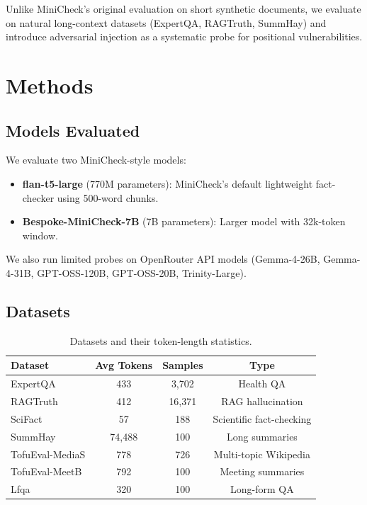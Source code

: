 \documentclass{article}
\begin{document}
Unlike MiniCheck's original evaluation on short synthetic documents, we evaluate on natural long-context datasets (ExpertQA, RAGTruth, SummHay) and introduce adversarial injection as a systematic probe for positional vulnerabilities.

\section{Methods}

\subsection{Models Evaluated}

We evaluate two MiniCheck-style models:
\begin{itemize}
    \item \textbf{flan-t5-large} (770M parameters): MiniCheck's default lightweight fact-checker using 500-word chunks.
    \item \textbf{Bespoke-MiniCheck-7B} (7B parameters): Larger model with 32k-token window.
\end{itemize}
We also run limited probes on OpenRouter API models (Gemma-4-26B, Gemma-4-31B, GPT-OSS-120B, GPT-OSS-20B, Trinity-Large).

\subsection{Datasets}

\begin{table}[t]
\caption{Datasets and their token-length statistics.}
\label{tab:datasets}
\centering
\begin{tabular}{lccc}
\toprule
Dataset & Avg Tokens & Samples & Type \\
\midrule
ExpertQA & 433 & 3,702 & Health QA \\
RAGTruth & 412 & 16,371 & RAG hallucination \\
SciFact & 57 & 188 & Scientific fact-checking \\
SummHay & 74,488 & 100 & Long summaries \\
TofuEval-MediaS & 778 & 726 & Multi-topic Wikipedia \\
TofuEval-MeetB & 792 & 100 & Meeting summaries \\
Lfqa & 320 & 100 & Long-form QA \\
\bottomrule
\end{tabular}
\end{table}
\end{document}
